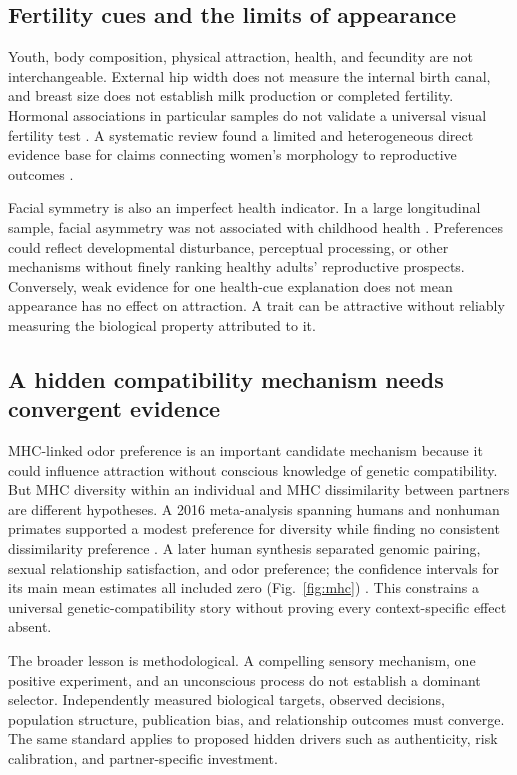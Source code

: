 \documentclass[10pt,twocolumn,letterpaper]{article}
\begin{document}
\subsection{Fertility cues and the limits of appearance}
Youth, body composition, physical attraction, health, and fecundity are not interchangeable. External hip width does not measure the internal birth canal, and breast size does not establish milk production or completed fertility. Hormonal associations in particular samples do not validate a universal visual fertility test \citep{jasienska,huseynov}. A systematic review found a limited and heterogeneous direct evidence base for claims connecting women's morphology to reproductive outcomes \citep{lidborg2025}.

Facial symmetry is also an imperfect health indicator. In a large longitudinal sample, facial asymmetry was not associated with childhood health \citep{pound}. Preferences could reflect developmental disturbance, perceptual processing, or other mechanisms without finely ranking healthy adults' reproductive prospects. Conversely, weak evidence for one health-cue explanation does not mean appearance has no effect on attraction. A trait can be attractive without reliably measuring the biological property attributed to it.

\subsection{A hidden compatibility mechanism needs convergent evidence}
MHC-linked odor preference is an important candidate mechanism because it could influence attraction without conscious knowledge of genetic compatibility. But MHC diversity within an individual and MHC dissimilarity between partners are different hypotheses. A 2016 meta-analysis spanning humans and nonhuman primates supported a modest preference for diversity while finding no consistent dissimilarity preference \citep{winternitz2017}. A later human synthesis separated genomic pairing, sexual relationship satisfaction, and odor preference; the confidence intervals for its main mean estimates all included zero (Fig.~\ref{fig:mhc}) \citep{havlicek2020}. This constrains a universal genetic-compatibility story without proving every context-specific effect absent.

The broader lesson is methodological. A compelling sensory mechanism, one positive experiment, and an unconscious process do not establish a dominant selector. Independently measured biological targets, observed decisions, population structure, publication bias, and relationship outcomes must converge. The same standard applies to proposed hidden drivers such as authenticity, risk calibration, and partner-specific investment.
\end{document}
